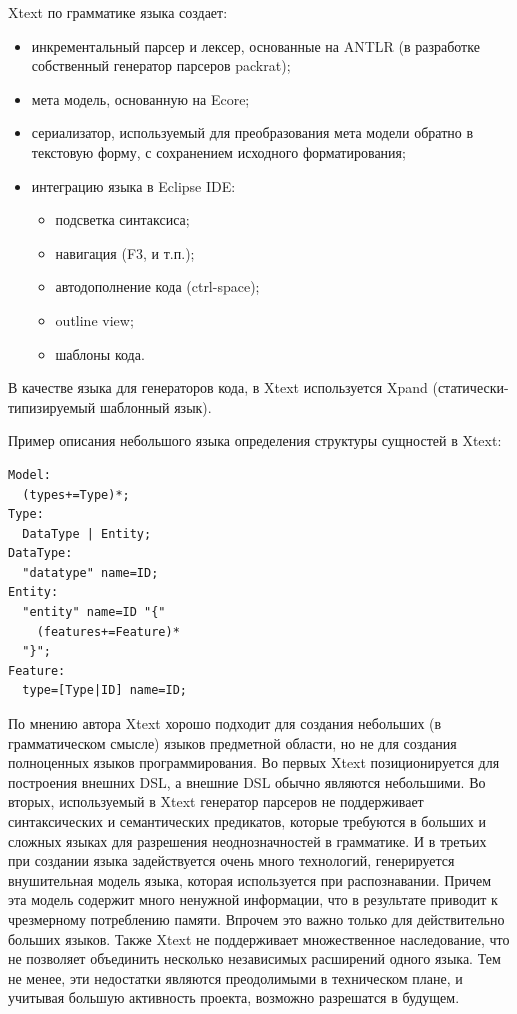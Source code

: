 \documentclass[a4paper,12pt,titlepage]{extarticle}
\begin{document}
Xtext по грамматике языка создает:
\begin{itemize}
  \item инкрементальный парсер и лексер, основанные на ANTLR (в разработке
  собственный генератор парсеров packrat);
  \item мета модель, основанную на Ecore;
  \item сериализатор, используемый для преобразования мета модели обратно в
  текстовую форму, с сохранением исходного форматирования; 
  \item интеграцию языка в Eclipse IDE:
  \begin{itemize}
    \item подсветка синтаксиса;
    \item навигация (F3, и т.п.);
    \item автодополнение кода (ctrl-space);
    \item outline view;
    \item шаблоны кода.
  \end{itemize}
\end{itemize}

В качестве языка для генераторов кода, в Xtext используется Xpand
(статически-типизируемый шаблонный язык).

Пример описания небольшого языка определения структуры сущностей в Xtext:
\begin{verbatim}
Model:
  (types+=Type)*;
Type:
  DataType | Entity;
DataType:
  "datatype" name=ID;
Entity:
  "entity" name=ID "{"
    (features+=Feature)* 
  "}";
Feature:
  type=[Type|ID] name=ID;   
\end{verbatim}

По мнению автора Xtext хорошо подходит для создания небольших (в грамматическом
смысле) языков предметной области, но не для создания полноценных языков
программирования. Во первых Xtext позиционируется для построения внешних DSL, а внешние DSL обычно
являются небольшими. Во вторых, используемый в Xtext генератор парсеров не
поддерживает синтаксических и семантических предикатов, которые требуются в
больших и сложных языках для разрешения неоднозначностей в грамматике. И в
третьих при создании языка задействуется очень много технологий, генерируется
внушительная модель языка, которая используется при распознавании. Причем эта
модель содержит много ненужной информации, что в результате приводит к
чрезмерному потреблению памяти. Впрочем это важно только для действительно
больших языков.
Также Xtext не поддерживает множественное наследование, что не позволяет
объединить несколько независимых расширений одного языка.
Тем не менее, эти недостатки являются преодолимыми в техническом плане, и
учитывая большую активность проекта, возможно разрешатся в будущем.
\end{document}
